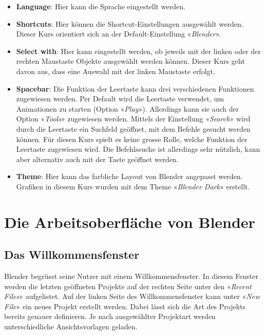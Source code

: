 \documentclass[
]{book}
\providecommand{\tightlist}{%
  \setlength{\itemsep}{0pt}\setlength{\parskip}{0pt}}\usepackage{longtable,booktabs,array}
\let\oldmarginnote\marginnote
\renewcommand{\marginnote}[1]{%
  \oldmarginnote{{\footnotesize\selectfont #1}}%
}
\newcommand{\kbd}[1]{\fbox{\texttt{#1}}}
\begin{document}
\begin{itemize}
\tightlist
\item
  \textbf{Language}: Hier kann die Sprache eingestellt werden.
\item
  \textbf{Shortcuts}: Hier können die Shortcut-Einstellungen ausgewählt
  werden. Dieser Kurs orientiert sich an der Default-Einstellung
  «\emph{Blender}».
\item
  \textbf{Select with}: Hier kann eingestellt werden, ob jeweils mit der
  linken oder der rechten Maustaste Objekte ausgewählt werden können.
  Dieser Kurs geht davon aus, dass eine Auswahl mit der linken Maustaste
  erfolgt.
\item
  \textbf{Spacebar}: Die Funktion der Leertaste kann drei verschiedenen
  Funktionen zugewiesen werden. Per Default wird die Leertaste
  verwendet, um Animationen zu starten (Option «\emph{Play}»).
  Allerdings kann sie auch der Option «\emph{Tools}» zugewiesen werden.
  Mittels der Einstellung «\emph{Search}» wird durch die Leertaste ein
  Suchfeld geöffnet, mit dem Befehle gesucht werden können. Für diesen
  Kurs spielt es keine grosse Rolle, welche Funktion der Leertaste
  zugewiesen wird. Die Befehlssuche ist allerdings sehr nützlich, kann
  aber alternativ auch mit der Taste \kbd{F3} geöffnet werden.
\item
  \textbf{Theme}: Hier kann das farbliche Layout von Blender angepasst
  werden. Grafiken in diesem Kurs wurden mit dem Theme «\emph{Blender
  Dark}» erstellt.
\end{itemize}

\section{Die Arbeitsoberfläche von
Blender}\label{die-arbeitsoberfluxe4che-von-blender}

\subsection{Das Willkommensfenster}\label{das-willkommensfenster}

\marginnote{Optionen im Willkommensfenster}

Blender begrüsst seine Nutzer mit einem Willkommensfenster. In diesem
Fenster werden die letzten geöffneten Projekte auf der rechten Seite
unter den «\emph{Recent Files}» aufgelistet. Auf der linken Seite des
Willkommensfenster kann unter «\emph{New File}» ein neues Projekt
erstellt werden. Dabei lässt sich die Art des Projekts bereits genauer
definieren. Je nach ausgewählter Projektart werden unterschiedliche
Ansichtsvorlagen geladen.
\end{document}
